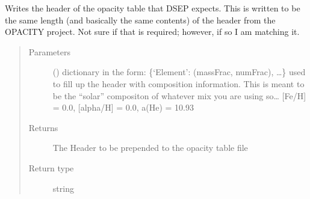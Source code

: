 \documentclass[letterpaper,10pt,english]{sphinxmanual}
\begin{document}
\begin{fulllineitems}
\label{\detokenize{pyTOPSScrape.api:pyTOPSScrape.api.convert.format_OPAL_header}}
\sphinxAtStartPar
Writes the header of the opacity table that DSEP expects. This is written
to be the same length (and basically the same contents) of the header
from the OPACITY project. Not sure if that is required; however, if so
I am matching it.
\begin{quote}\begin{description}
\item[{Parameters}] \leavevmode
\sphinxAtStartPar
{} () \textendash{} dictionary in the form: \{‘Element’: (massFrac, numFrac), …\} used
to fill up the header with composition information. This is meant
to be the “solar” compositon of whatever mix you are using so…
{[}Fe/H{]} = 0.0, {[}alpha/H{]} = 0.0, a(He) = 10.93

\item[{Returns}] \leavevmode
\sphinxAtStartPar
The Header to be prepended to the opacity table file

\item[{Return type}] \leavevmode
\sphinxAtStartPar
string

\end{description}\end{quote}

\end{fulllineitems}

\end{document}
